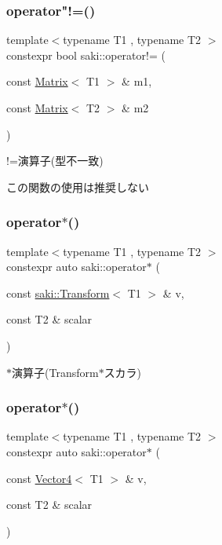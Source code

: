 \subsubsection{\texorpdfstring{operator"!=()}{operator!=()}\hspace{0.1cm}{\footnotesize\ttfamily [11/11]}}
{\footnotesize\ttfamily template$<$typename T1 , typename T2 $>$ \\
constexpr bool saki\+::operator!= (\begin{DoxyParamCaption}\item[{const \mbox{\hyperlink{classsaki_1_1_matrix}{Matrix}}$<$ T1 $>$ \&}]{m1,  }\item[{const \mbox{\hyperlink{classsaki_1_1_matrix}{Matrix}}$<$ T2 $>$ \&}]{m2 }\end{DoxyParamCaption})}



!=演算子(型不一致) 

この関数の使用は推奨しない \mbox{\label{namespacesaki_a4ccd8e3dbc886bb65d452308a8de0409}} 
\subsubsection{\texorpdfstring{operator$\ast$()}{operator*()}\hspace{0.1cm}{\footnotesize\ttfamily [1/14]}}
{\footnotesize\ttfamily template$<$typename T1 , typename T2 $>$ \\
constexpr auto saki\+::operator$\ast$ (\begin{DoxyParamCaption}\item[{const \mbox{\hyperlink{classsaki_1_1_transform}{saki\+::\+Transform}}$<$ T1 $>$ \&}]{v,  }\item[{const T2 \&}]{scalar }\end{DoxyParamCaption})}



$\ast$演算子(Transform$\ast$スカラ) 

\mbox{\label{namespacesaki_a856b63c2955b0387574c0b5e6d3c0b87}} 
\subsubsection{\texorpdfstring{operator$\ast$()}{operator*()}\hspace{0.1cm}{\footnotesize\ttfamily [2/14]}}
{\footnotesize\ttfamily template$<$typename T1 , typename T2 $>$ \\
constexpr auto saki\+::operator$\ast$ (\begin{DoxyParamCaption}\item[{const \mbox{\hyperlink{classsaki_1_1_vector4}{Vector4}}$<$ T1 $>$ \&}]{v,  }\item[{const T2 \&}]{scalar }\end{DoxyParamCaption})}



